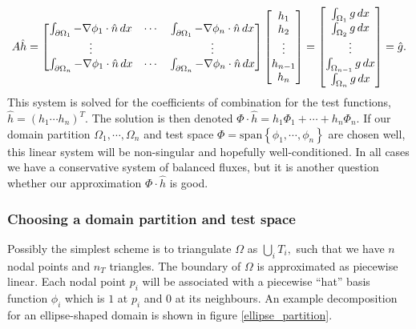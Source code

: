 \newcommand{\integralentry}[2]{\int_{\pom_{#1}}-\nabla\phi_{#2}\cdot\hat{n}\,dx}
\begin{equation}\label{poisson_matrix_equation}
    A\hat{h} = \begin{bmatrix}
            \integralentry{1}{1} & \cdots & \integralentry{1}{n} \\
            \vdots & & \vdots \\
            \integralentry{n}{1} & \cdots & \integralentry{n}{n}
            \end{bmatrix}
    \begin{bmatrix} h_1 \\ h_2 \\ \vdots \\ h_{n-1} \\ h_n \end{bmatrix}
    =
    \begin{bmatrix} \int_{\om_1}g\,dx \\ \int_{\om_2}g\,dx \\ \vdots \\ \int_{\om_{n-1}}g\,dx \\ \int_{\om_n}g\,dx \end{bmatrix}
    = \hat{g}.
\end{equation}
This system is solved for the coefficients of combination for the test functions, $\hat{h} = (h_1 \cdots h_n)^T$.
The solution is then denoted $\Phi\cdot\hat{h} = h_1\Phi_1 + \cdots + h_n\Phi_n$.
If our domain partition $\Omega_1,\cdots,\Omega_n$ and test space $\Phi = \text{span}\left\{\phi_1,\cdots,\phi_n\right\}$
are chosen well, this linear system will be non-singular and hopefully well-conditioned.
In all cases we have a conservative system of balanced fluxes, but it is another question whether our approximation
$\Phi\cdot\hat{h}$ is good.

\subsubsection{Choosing a domain partition and test space}
Possibly the simplest scheme is to triangulate $\Omega$ as
    $\bigcup_i T_i,$
such that we have $n$ nodal points and $n_T$ triangles. The boundary of $\Omega$ is approximated as piecewise linear.
Each nodal point $p_i$ will be associated with a piecewise ``hat'' basis function $\phi_i$ which is $1$ at $p_i$ and
$0$ at its neighbours. An example decomposition for an ellipse-shaped domain is shown in figure \ref{ellipse_partition}.

